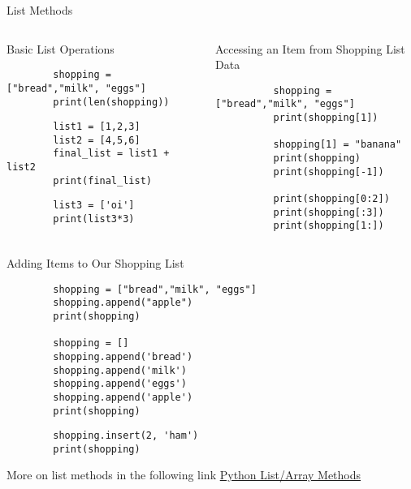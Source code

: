 \documentclass[../main.tex]{subfiles}
\begin{document}
\begin{frame}[fragile]{List Methods}
    \begin{columns}[t]
        \begin{exercise}{Basic List Operations}
      \begin{lstlisting}
        shopping = ["bread","milk", "eggs"]
        print(len(shopping))
      \end{lstlisting}
      \begin{lstlisting}
        list1 = [1,2,3]
        list2 = [4,5,6]
        final_list = list1 + list2
        print(final_list)
      \end{lstlisting}
   
      \begin{lstlisting}
        list3 = ['oi']
        print(list3*3)
      \end{lstlisting}
    \end{exercise}
      \begin{exercise}{Accessing an Item from Shopping List Data}
        \begin{lstlisting}
          shopping = ["bread","milk", "eggs"]
          print(shopping[1])

          shopping[1] = "banana"
          print(shopping)
          print(shopping[-1])

          print(shopping[0:2])
          print(shopping[:3])
          print(shopping[1:])
        \end{lstlisting}
      \end{exercise}
    \end{columns}

  \end{frame}

  \begin{frame}[fragile]{}
    \begin{exercise}{Adding Items to Our Shopping List}
      \begin{lstlisting}
        shopping = ["bread","milk", "eggs"]
        shopping.append("apple")
        print(shopping)

        shopping = []
        shopping.append('bread')
        shopping.append('milk')
        shopping.append('eggs')
        shopping.append('apple')
        print(shopping)
      \end{lstlisting}
      \begin{lstlisting}
        shopping.insert(2, 'ham')
        print(shopping)
      \end{lstlisting}
    \end{exercise}

    More on list methods in the following link \href{https://www.w3schools.com/python/python_ref_list.asp}{Python List/Array Methods}
  \end{frame}

  
  
  
\end{document}
